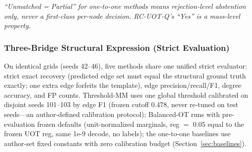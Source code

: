 \emph{``Unmatched = Partial'' for one-to-one methods means rejection-level abstention only, never a first-class per-node decision. RC-UOT-Q's ``Yes'' is a mass-level property.}

\subsubsection{Three-Bridge Structural Expression (Strict Evaluation)}
\label{sec:strict}

On identical grids (seeds 42--46), five methods share one unified strict evaluator: strict exact recovery (predicted edge set must equal the structural ground truth exactly; one extra edge forfeits the template), edge precision/recall/F1, degree accuracy, and FP counts. Threshold-MM uses one global threshold calibrated on disjoint seeds 101--103 by edge F1 (frozen cutoff 0.478, never re-tuned on test seeds---an author-defined calibration protocol); Balanced-OT runs with pre-evaluation frozen defaults (unit-normalized marginals, reg $=$ 0.05 equal to the frozen UOT reg, same 1e-9 decode, no labels); the one-to-one baselines use author-set fixed constants with zero calibration budget (Section~\ref{sec:baselines}).

